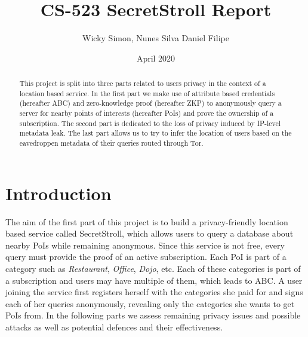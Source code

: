 \documentclass[10pt,conference,compsocconf]{IEEEtran}
\title{CS-523 SecretStroll Report}
\author{Wicky Simon, Nunes Silva Daniel Filipe}
\date{April 2020}
\begin{document}
\maketitle

\begin{abstract}
  This project is split into three parts related to users privacy in the context of a location based service.
  In the first part we make use of attribute based credentials (hereafter ABC) and zero-knowledge proof (hereafter ZKP) to anonymously query a server for nearby points of interests (hereafter PoIs) and prove the ownership of a subscription. The second part is dedicated to the loss of privacy induced by IP-level metadata leak. The last part allows us to try to infer the location of users based on the eavedroppen metadata of their queries routed through Tor.
\end{abstract}

\section{Introduction}

The aim of the first part of this project is to build a privacy-friendly location based service called SecretStroll, which allows users to query a database about nearby PoIs while remaining anonymous. Since this service is not free, every query must provide the proof of an active subscription. Each PoI is part of a category such as \textit{Restaurant}, \textit{Office}, \textit{Dojo}, etc. Each of these categories is part of a subscription and users may have multiple of them, which leads to ABC. A user joining the service first registers herself with the categories she paid for and signs each of her queries anonymously, revealing only the categories she wants to get PoIs from. In the following parts we assess remaining privacy issues and possible attacks as well as potential defences and their effectiveness.
\end{document}
